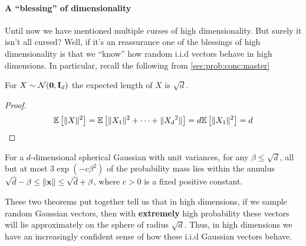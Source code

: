     \paragraph{A ``blessing'' of dimensionality}
    Until now we have mentioned multiple curses of high dimensionality. But surely it isn't all cursed? Well, if it's an reassurance one of the blessings of high dimensionality is that we ``know'' how random i.i.d vectors behave in high dimensions. In particular, recall the following from \autoref{sec:prob:conc:master}
    \begin{thm}
    For $X \sim \mathcal{N}({\bf 0}, {\bf I}_d)$ the expected length of $X$ is $\sqrt{d}$.
    \end{thm}
    \begin{proof}
    \begin{align*}
        \mathbb{E}\left[\lVert X \rVert^2\right] = \mathbb{E}\left[\lVert X_1 \rVert^2 + \dots + \lVert {X_d}^2 \rVert\right] = d\mathbb{E}\left[\lVert X_1 \rVert^2\right] = d
    \end{align*}
    \end{proof}
    \begin{thm}
    For a $d$-dimensional spherical Gaussian with unit variances, for any $\beta \leq \sqrt{d}$, all but at most $3\exp\left(-c\beta^2\right)$ of the probability mass lies within the annulus $\sqrt{d} - \beta \leq \lVert {\bf x} \rVert \leq \sqrt{d} + \beta$, where $c > 0$ is a fixed positive constant.
    \end{thm}
    These two theorems put together tell us that in high dimensions, if we sample random Gaussian vectors, then with {\bf extremely} high probability these vectors will lie approximately on the sphere of radius $\sqrt{d}$. Thus, in high dimensions we have an increasingly confident sense of how these i.i.d Gaussian vectors behave.